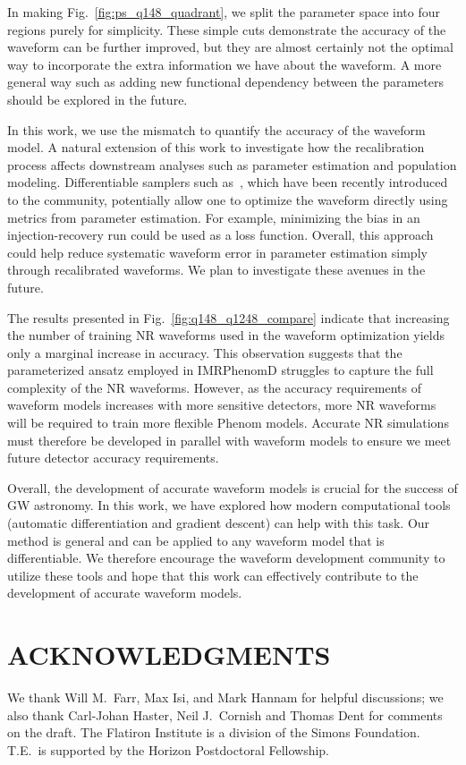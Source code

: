 \documentclass[twocolumn]{aastex631}
\begin{document}
In making Fig.~\ref{fig:ps_q148_quadrant}, we split the parameter space into four regions purely for simplicity.
These simple cuts demonstrate the accuracy of the waveform can be further improved,
but they are almost certainly not the optimal way to incorporate the extra information
we have about the waveform. A more general way such as adding new functional dependency
between the parameters should be explored in the future.

In this work, we use the mismatch to quantify the accuracy of the waveform model. 
A natural extension of this work to investigate how the recalibration process affects
downstream analyses such as parameter estimation and population modeling.
Differentiable samplers such as~\citep{Wong:2022xvh}, which have been recently
introduced to the community, potentially allow one to optimize the waveform directly
using metrics from parameter estimation. For example, minimizing the bias in an injection-recovery run
could be used as a loss function. Overall, this approach could help reduce systematic waveform error
in parameter estimation simply through recalibrated waveforms. We plan to investigate these avenues in
the future.

The results presented in Fig.~\ref{fig:q148_q1248_compare} indicate that
increasing the number of training NR waveforms used in the waveform optimization yields
only a marginal increase in accuracy. This observation suggests that the parameterized ansatz employed 
in IMRPhenomD struggles to capture the full complexity of the NR waveforms. 
However, as the accuracy requirements of waveform models increases with more sensitive detectors,
more NR waveforms will be required to train more flexible Phenom models. 
Accurate NR simulations must therefore be developed in parallel with waveform models
to ensure we meet future detector accuracy requirements.

Overall, the development of accurate waveform models is crucial for the success of GW astronomy.
In this work, we have explored how modern computational tools (automatic differentiation and gradient descent)
can help with this task. 
Our method is general and can be applied to any waveform model that is differentiable.
We therefore encourage the waveform development community to utilize these tools
and hope that this work can effectively contribute to the development of accurate waveform models.



\section{ACKNOWLEDGMENTS}

We thank Will M.~Farr, Max Isi, and Mark Hannam for helpful discussions; we also
thank Carl-Johan Haster, Neil J.~Cornish and Thomas Dent for comments on the
draft. The Flatiron Institute is a division of the Simons Foundation. T.E.\ is
supported by the Horizon Postdoctoral Fellowship.

\end{document}
